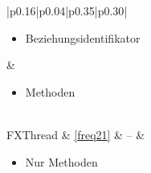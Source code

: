 \begin{longtable}[H]{|p{0.16\textwidth}|p{0.04\textwidth}|p{0.35\textwidth}|p{0.30\textwidth}|}
\begin{minipage}[t]{\linewidth}
\begin{itemize}[nosep,after=\strut,leftmargin=*]
				\item Beziehungsidentifikator
			\end{itemize}
		\end{minipage} & 
		\begin{minipage}[t]{\linewidth}
			\begin{itemize}[nosep,after=\strut,leftmargin=*]
				\item Methoden
			\end{itemize}
		\end{minipage} \\
		\hline
		FXThread & \ref{freq21} & -- & 
		\begin{minipage}[t]{\linewidth}
			\begin{itemize}[nosep,after=\strut,leftmargin=*]
				\item Nur Methoden
			\end{itemize}
		\end{minipage} \\
		\hline
\end{longtable}